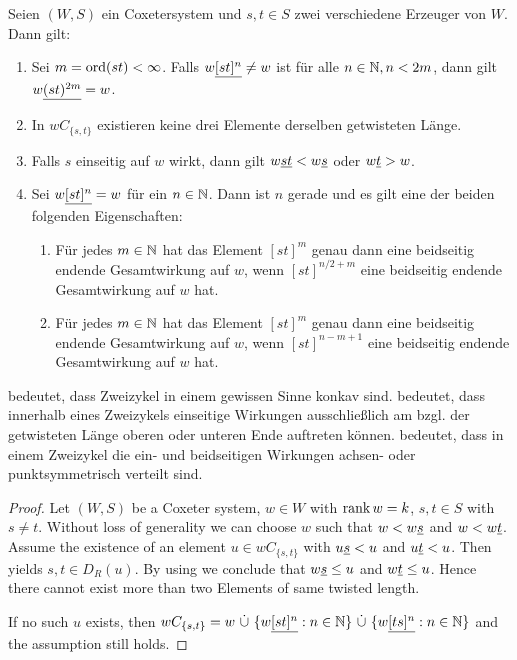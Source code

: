 \begin{assu}
Seien $(W,S)$ ein Coxetersystem und $s,t \in S$ zwei verschiedene Erzeuger
von $W$. Dann gilt:
\begin{enumerate}
  \item \label{max-twocycle-length} Sei $m = \operatorname{ord} (st) < \infty$. Falls
  $w \underline{[st]^n} \neq w$ ist für alle $n \in \mathbb{N}, n < 2m$, dann gilt $w \underline{(st)^{2m}} = w$.
  \item \label{twocycle-is-convex} In $wC_{\{s,t\}}$ existieren keine drei
  Elemente derselben getwisteten Länge.
  \item \label{onesided-operations-only-at-top-or-bottom-end-of-twocycle}
  Falls $s$ einseitig auf $w$ wirkt, dann gilt $w \underline{st} < w \underline{s}$ oder $w
  \underline{t} > w$.
  \item \label{twocycle-symmetry} Sei $w \underline{[st]^n} = w$ für ein $n \in
  \mathbb{N}$. Dann ist $n$ gerade und es gilt eine der beiden folgenden Eigenschaften:
  	\begin{enumerate}
  	  \item Für jedes $m \in \mathbb{N}$ hat das Element $[st]^m$ genau dann eine
  	  beidseitig endende Gesamt\-wirkung auf $w$, wenn $[st]^{n/2+m}$ eine
  	  beidseitig endende Gesamtwirkung auf $w$ hat.
  	  \item Für jedes $m \in \mathbb{N}$ hat das Element $[st]^m$ genau dann eine
  	  beidseitig endende Gesamt\-wirkung auf $w$, wenn $[st]^{n-m+1}$ eine
  	  beidseitig endende Gesamtwirkung auf $w$ hat.
  	\end{enumerate}
\end{enumerate}
\end{assu}

\begin{rema}
	 bedeutet, dass Zweizykel in einem
	gewissen Sinne konkav sind.
	 bedeutet,
	dass innerhalb eines Zweizykels einseitige Wirkungen ausschließlich am bzgl.
	der ge\-twis\-te\-ten Länge oberen oder unteren Ende auftreten können.
	 bedeutet, dass in einem Zweizykel die
	ein- und beidseitigen Wirkungen achsen- oder punktsymmetrisch verteilt sind.
\end{rema}

\begin{lemm}
\begin{proof}
Let $(W,S)$ be a Coxeter system, $w \in W$ with $\operatorname{rank} w = k$, $s, t \in S$ with
$s \neq t$. Without loss of generality we can choose $w$ such that $w < w \underline{s}$
and $w < w \underline{t}$. Assume the existence of an element $u \in wC_{\{s,t\}}$ with
$u \underline{s} < u$ and $u \underline{t} < u$. Then \cite[Lemma
3.8]{hultman:comb-twisted-invo} yields $s,t \in D_R(u)$. By using \cite[Lemma
3.9]{hultman:comb-twisted-invo} we conclude that $w \underline{s} \leq u$ and $w \underline{t}
\leq u$. Hence there cannot exist more than two Elements of same twisted
length.

If no such $u$ exists, then $wC_{\{s,t\}} = w \ \dot \cup \ \{ w \ul{[st]^n} : n
\in \nn \} \ \dot \cup \ \{ w \ul{[ts]^n} : n \in \nn \}$ and the assumption
still holds.
\end{proof}
\end{lemm}